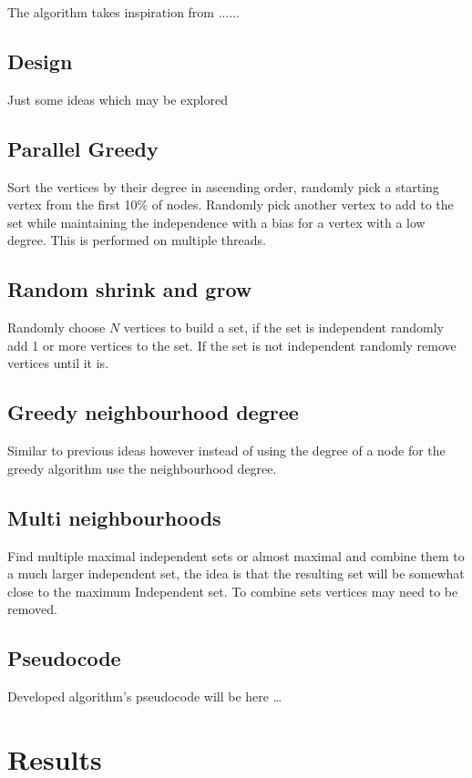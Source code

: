 \documentclass[conference]{IEEEtran}
\begin{document}
The algorithm takes inspiration from ......

\subsection{Design}

Just some ideas which may be explored

\subsection{Parallel Greedy}

Sort the vertices by their degree in ascending order, randomly pick a starting vertex from the first 10\% of nodes. 
Randomly pick another vertex to add to the set while maintaining the independence with a bias for a vertex with a low 
degree. This is performed on multiple threads.

\subsection{Random shrink and grow}

Randomly choose $N$ vertices to build a set, if the set is independent randomly add 1 or more vertices to the set.
If the set is not independent randomly remove vertices until it is.

\subsection{Greedy neighbourhood degree}
Similar to previous ideas however instead of using the degree of a node for the greedy algorithm use the neighbourhood 
degree.

\subsection{Multi neighbourhoods}
Find multiple maximal independent sets or almost maximal and combine them to a much larger independent set, the idea is 
that the resulting set will be somewhat close to the maximum Independent set. To combine sets vertices may need to be 
removed.

\subsection{Pseudocode}

Developed algorithm's pseudocode will be here \dots

\section{Results}
\end{document}
